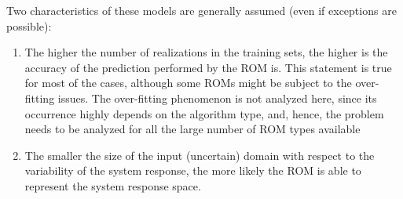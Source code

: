 Two characteristics of these models
are generally assumed (even if exceptions are possible):
\begin{enumerate}
  \item The higher the number of realizations in the training sets, the
higher is the accuracy of the prediction performed by the ROM is. This
statement is true for most of the cases, although some ROMs might be
subject to the over-fitting issues. The over-fitting phenomenon is not
analyzed here, since its occurrence highly depends on the
algorithm type, and, hence, the problem needs to be analyzed for all
the large number of ROM types available
  \item The smaller the size of the input (uncertain) domain with
  respect to the variability of the system response, the more likely the
  ROM is able to represent the system response space.
\end{enumerate}

